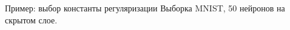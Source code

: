 \documentclass[10pt,pdf,utf8,russian,aspectratio=169]{beamer}
\begin{document}
\begin{frame}{Пример: выбор константы регуляризации}
Выборка MNIST, 50 нейронов на скрытом слое.

\begin{figure}
  \centering
\label{fig:1}\qquad
\end{figure}

\end{frame}
\end{document}
